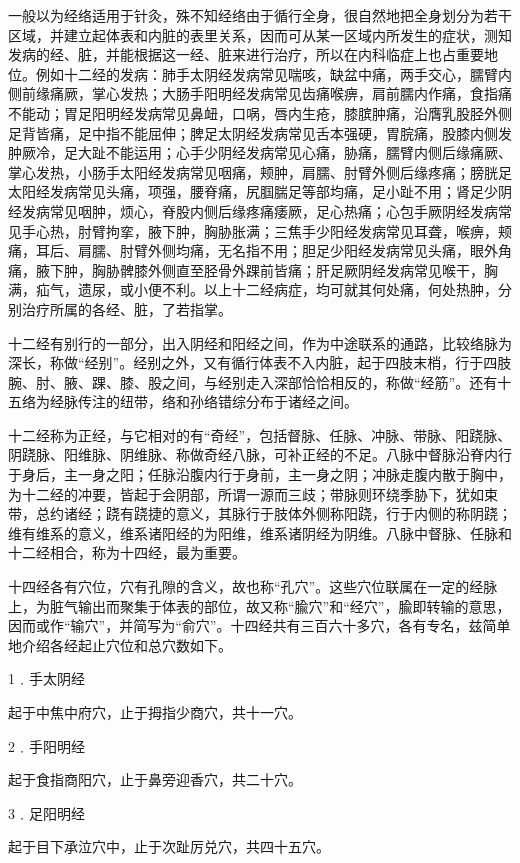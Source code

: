 \documentclass[a4paper,12pt,UTF8,twoside]{ctexbook}
\begin{document}
一般以为经络适用于针灸，殊不知经络由于循行全身，很自然地把全身划分为若干区域，并建立起体表和内脏的表里关系，因而可从某一区域内所发生的症状，测知发病的经、脏，并能根据这一经、脏来进行治疗，所以在内科临症上也占重要地位。例如十二经的发病：肺手太阴经发病常见喘咳，缺盆中痛，两手交心，臑臂内侧前缘痛厥，掌心发热；大肠手阳明经发病常见齿痛喉痹，肩前臑内作痛，食指痛不能动；胃足阳明经发病常见鼻衄，口㖞，唇内生疮，膝膑肿痛，沿膺乳股胫外侧足背皆痛，足中指不能屈伸；脾足太阴经发病常见舌本强硬，胃脘痛，股膝内侧发肿厥冷，足大趾不能运用；心手少阴经发病常见心痛，胁痛，臑臂内侧后缘痛厥、掌心发热，小肠手太阳经发病常见咽痛，颊肿，肩臑、肘臂外侧后缘疼痛；膀胱足太阳经发病常见头痛，项强，腰脊痛，尻腘腨足等部均痛，足小趾不用；肾足少阴经发病常见咽肿，烦心，脊股内侧后缘疼痛痿厥，足心热痛；心包手厥阴经发病常见手心热，肘臂拘挛，腋下肿，胸胁胀满；三焦手少阳经发病常见耳聋，喉痹，颊痛，耳后、肩臑、肘臂外侧均痛，无名指不用；胆足少阳经发病常见头痛，眼外角痛，腋下肿，胸胁髀膝外侧直至胫骨外踝前皆痛；肝足厥阴经发病常见喉干，胸满，疝气，遗尿，或小便不利。以上十二经病症，均可就其何处痛，何处热肿，分别治疗所属的各经、脏，了若指掌。

十二经有别行的一部分，出入阴经和阳经之间，作为中途联系的通路，比较络脉为深长，称做“经别”。经别之外，又有循行体表不入内脏，起于四肢末梢，行于四肢腕、肘、腋、踝、膝、股之间，与经别走入深部恰恰相反的，称做“经筋”。还有十五络为经脉传注的纽带，络和孙络错综分布于诸经之间。

十二经称为正经，与它相对的有“奇经”，包括督脉、任脉、冲脉、带脉、阳跷脉、阴跷脉、阳维脉、阴维脉、称做奇经八脉，可补正经的不足。八脉中督脉沿脊内行于身后，主一身之阳；任脉沿腹内行于身前，主一身之阴；冲脉走腹内散于胸中，为十二经的冲要，皆起于会阴部，所谓一源而三歧；带脉则环绕季胁下，犹如束带，总约诸经；跷有跷捷的意义，其脉行于肢体外侧称阳跷，行于内侧的称阴跷；维有维系的意义，维系诸阳经的为阳维，维系诸阴经为阴维。八脉中督脉、任脉和十二经相合，称为十四经，最为重要。

十四经各有穴位，穴有孔隙的含义，故也称“孔穴”。这些穴位联属在一定的经脉上，为脏气输出而聚集于体表的部位，故又称“腧穴”和“经穴”，腧即转输的意思，因而或作“输穴”，并简写为“俞穴”。十四经共有三百六十多穴，各有专名，兹简单地介绍各经起止穴位和总穴数如下。

1﹒手太阴经

起于中焦中府穴，止于拇指少商穴，共十一穴。

2﹒手阳明经

起于食指商阳穴，止于鼻旁迎香穴，共二十穴。

3﹒足阳明经

起于目下承泣穴中，止于次趾厉兑穴，共四十五穴。
\end{document}
